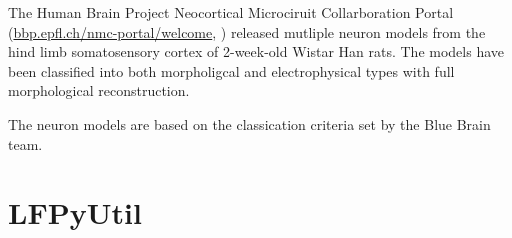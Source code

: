 \documentclass[altfont, fleqn]{uiophd}
\begin{document}
The Human Brain Project Neocortical
Microciruit Collarboration Portal
(\url{bbp.epfl.ch/nmc-portal/welcome},
\textcite{ramaswamy_neocortical_2015})
released mutliple neuron models from the hind limb somatosensory cortex 
of 2-week-old Wistar Han rats.
The models have been classified into both morpholigcal and electrophysical
types with full morphological reconstruction. 

The neuron models are based on the classication criteria set by the Blue Brain 
team.





\newpage
\section{LFPyUtil}
\end{document}
